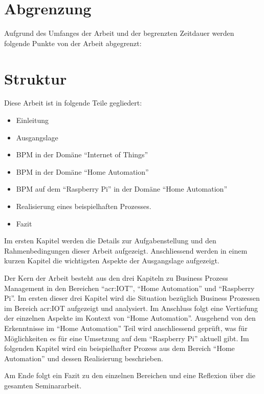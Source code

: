 \section{Abgrenzung} \label{sec:Abgrenzung}
Aufgrund des Umfanges der Arbeit und der begrenzten Zeitdauer werden folgende Punkte von der Arbeit abgegrenzt:

\begin{itemize}
\end{itemize}


\section{Struktur}
Diese Arbeit ist in folgende Teile gegliedert:

\begin{itemize}
\item Einleitung
\item Ausgangslage
\item BPM in der Domäne "`Internet of Things"'
\item BPM in der Domäne "`Home Automation"'
\item BPM auf dem "`Raspberry Pi"' in der Domäne "`Home Automation"'
\item Realisierung eines beispielhaften Prozesses.
\item Fazit
\end{itemize}

Im ersten Kapitel werden die Details zur Aufgabenstellung und den Rahmenbedingungen dieser Arbeit aufgezeigt. Anschliessend werden in einem kurzen Kapitel die wichtigsten Aspekte der Ausgangslage aufgezeigt.

Der Kern der Arbeit besteht aus den drei Kapiteln zu Business Prozess Management in den Bereichen "`\gls{acr:IOT}"', "`Home Automation"' und "`Raspberry Pi"'. Im ersten dieser drei Kapitel wird die Situation bezüglich Business Prozessen im Bereich \gls{acr:IOT} aufgezeigt und analysiert. Im Anschluss folgt eine Vertiefung der einzelnen Aspekte im Kontext von "`Home Automation"'. Ausgehend von den Erkenntnisse im "`Home Automation"' Teil wird anschliessend geprüft, was für Möglichkeiten es für eine Umsetzung auf dem "`Raspberry Pi"' aktuell gibt. Im folgenden Kapitel wird ein beispielhafter Prozess aus dem Bereich "`Home Automation"' und dessen Realisierung  beschrieben.

Am Ende folgt ein Fazit zu den einzelnen Bereichen und eine Reflexion über die gesamten Seminararbeit.

